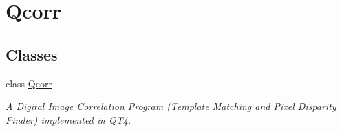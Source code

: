 \hypertarget{group__qcorr__mainwindow}{
\section{Qcorr}
\label{group__qcorr__mainwindow}
}
\subsection*{Classes}
\begin{CompactItemize}
\item 
class \hyperlink{classQcorr}{Qcorr}
\begin{CompactList}\small\item\em A Digital Image Correlation Program (Template Matching and Pixel Disparity Finder) implemented in QT4. \item\end{CompactList}\end{CompactItemize}
